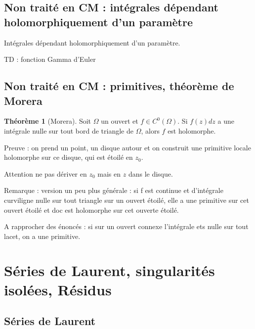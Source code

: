 \documentclass[11pt,a4paper]{book}
\theoremstyle{definition}
\newtheorem{theoreme}{Th\'eor\`eme}[section]
\theoremstyle{plain}
\begin{document}
\section{Non traité  en CM : intégrales dépendant holomorphiquement d'un paramètre}

Intégrales dépendant holomorphiquement d'un paramètre.

TD : fonction Gamma d'Euler


\section{Non traité en CM : primitives, théorème de Morera}

\begin{theoreme}[Morera]
Soit $\Omega$ un ouvert et $f \in C^0(\Omega)$.
Si $f(z)dz$ a une intégrale nulle sur tout bord de triangle de $\Omega$, alors $f$ est holomorphe.
\end{theoreme}

Preuve : on prend un point, un disque autour et on construit une primitive locale holomorphe sur ce disque, qui est étoilé en $z_0$.

Attention ne pas dériver en $z_0$ mais en $z$ dans le disque.

Remarque  : version un peu plus générale : si f est continue et d'intégrale curviligne nulle sur tout triangle sur un ouvert étoilé, elle a une primitive sur cet ouvert étoilé et doc est holomorphe sur cet ouverte étoilé.

A rapprocher des énoncés : si sur un ouvert connexe l'intégrale ets nulle sur tout lacet, on a une primitive.









\chapter{Séries de Laurent, singularités isolées, Résidus}

\section{Séries de Laurent}
\end{document}
